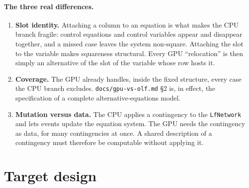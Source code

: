 \documentclass[11pt,a4paper]{article}
\newcommand{\code}[1]{\texttt{\small #1}}
\begin{document}
\paragraph{The three real differences.}
\begin{enumerate}
\item \textbf{Slot identity.} Attaching a column to an equation is what makes the CPU
      branch fragile: control equations and control variables appear and disappear
      together, and a missed case leaves the system non-square. Attaching the slot to
      the variable makes squareness structural. Every GPU ``relocation'' is then simply
      an alternative of the slot of the variable whose row hosts it.
\item \textbf{Coverage.} The GPU already handles, inside the fixed structure, every case
      the CPU branch excludes. \code{docs/gpu-vs-olf.md} \S2 is, in effect, the
      specification of a complete alternative-equations model.
\item \textbf{Mutation versus data.} The CPU applies a contingency to the
      \code{LfNetwork} and lets events update the equation system. The GPU needs the
      contingency as data, for many contingencies at once. A shared description of a
      contingency must therefore be computable without applying it.
\end{enumerate}

\section{Target design}
\end{document}
